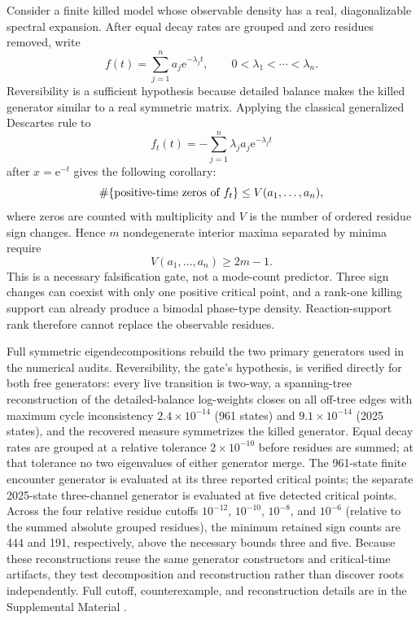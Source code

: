 \documentclass[aps,pre,reprint,amsmath,amssymb,longbibliography,floatfix]{revtex4-2}
\newcommand{\e}{\mathrm e}
\begin{document}
Consider a finite killed model whose observable density has a real,
diagonalizable spectral expansion. After equal decay rates are grouped and
zero residues removed, write
\begin{equation}
f(t)=\sum_{j=1}^{n}a_j\e^{-\lambda_jt},
\qquad 0<\lambda_1<\cdots<\lambda_n.
\label{eq:spectral-density}
\end{equation}
Reversibility is a sufficient hypothesis because detailed balance makes the
killed generator similar to a real symmetric matrix. Applying the classical
generalized Descartes rule \cite{jameson2006descartes} to
\begin{equation}
f_t(t)=-\sum_{j=1}^{n}\lambda_ja_j\e^{-\lambda_jt}
\label{eq:spectral-derivative}
\end{equation}
after \(x=\e^{-t}\) gives the following corollary:
\[
\#\{\hbox{positive-time zeros of }f_t\}
\leq V(a_1,\ldots,a_n),
\]
where zeros are counted with multiplicity and \(V\) is the number of ordered
residue sign changes. Hence \(m\) nondegenerate interior maxima separated by
minima require
\begin{equation}
V(a_1,\ldots,a_n)\geq2m-1.
\label{eq:spectral-mode-bound}
\end{equation}
This is a necessary falsification gate, not a mode-count predictor. Three
sign changes can coexist with only one positive critical point, and a
rank-one killing support can already produce a bimodal phase-type density.
Reaction-support rank therefore cannot replace the observable residues.

Full symmetric eigendecompositions rebuild the two primary generators used in
the numerical audits. Reversibility, the gate's hypothesis, is verified
directly for both free generators: every live transition is two-way, a
spanning-tree reconstruction of the detailed-balance log-weights closes on
all off-tree edges with maximum cycle inconsistency \(2.4\times10^{-14}\)
(961 states) and \(9.1\times10^{-14}\) (2025 states), and the recovered
measure symmetrizes the killed generator. Equal decay rates are grouped at a
relative tolerance \(2\times10^{-10}\) before residues are summed; at that
tolerance no two eigenvalues of either generator merge. The 961-state finite
encounter generator is evaluated
at its three reported critical points; the separate 2025-state
three-channel generator is evaluated at five detected critical
points. Across the four relative residue cutoffs \(10^{-12}\), \(10^{-10}\),
\(10^{-8}\), and \(10^{-6}\) (relative to the summed absolute grouped
residues), the
minimum retained sign counts are 444 and 191, respectively, above the
necessary bounds three and five. Because these reconstructions reuse the
same generator constructors and critical-time artifacts, they test decomposition
and reconstruction rather than discover roots independently. Full cutoff,
counterexample, and reconstruction details are in the Supplemental Material
\cite{supplementalMaterial}.
\end{document}
